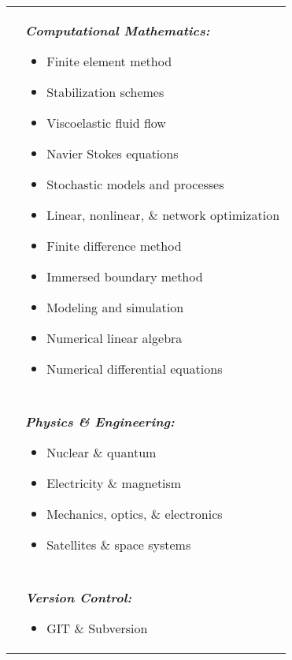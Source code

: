 \documentclass[10pt]{article}
\begin{document}
\begin{multicols}{2}
\hskip-1.0in
\begin{tabularx}{1.5\linewidth}{>{\raggedleft\scshape}p{3cm}X}
  &\textbf{\textit{Computational Mathematics:}}\begin{itemize}
  \setlength\itemsep{.005em}
  \item Finite element method
  \item Stabilization schemes 
  \item Viscoelastic fluid flow
  \item Navier Stokes equations
  \item Stochastic models and processes
  \item Linear, nonlinear, \& network optimization
  \item Finite difference method
  \item Immersed boundary method
  \item Modeling and simulation
  \item Numerical linear algebra
  \item Numerical differential equations
\end{itemize} \\
\\
  &\textbf{\textit{Physics \& Engineering:}}\begin{itemize}
  \setlength\itemsep{.005em}
  \item Nuclear \& quantum  
  \item Electricity \& magnetism
  \item Mechanics, optics, \& electronics
  \item Satellites \& space systems
  \end{itemize} \\
  \\
  &\textbf{\textit{Version Control:}}\begin{itemize}
  \setlength\itemsep{.005em}
  \item GIT \& Subversion
\end{itemize} 
 
\end{tabularx}
\end{multicols}
\end{document}
